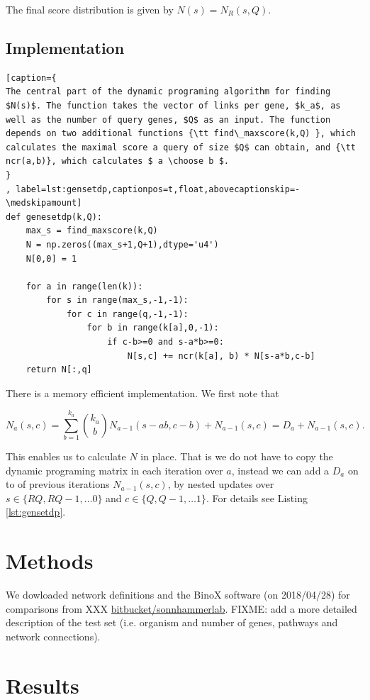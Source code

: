 \documentclass[a4paper,american]{lipics-v2016}
\begin{document}
The final score distribution is given by $N(s)=N_R(s,Q)$.

\subsection*{Implementation}

\begin{lstlisting}[caption={
The central part of the dynamic programing algorithm for finding $N(s)$. The function takes the vector of links per gene, $k_a$, as well as the number of query genes, $Q$ as an input. The function depends on two additional functions {\tt find\_maxscore(k,Q) }, which calculates the maximal score a query of size $Q$ can obtain, and {\tt ncr(a,b)}, which calculates $ a \choose b $.
}
, label=lst:gensetdp,captionpos=t,float,abovecaptionskip=-\medskipamount]
def genesetdp(k,Q):
    max_s = find_maxscore(k,Q)
    N = np.zeros((max_s+1,Q+1),dtype='u4')
    N[0,0] = 1

    for a in range(len(k)):
        for s in range(max_s,-1,-1):
            for c in range(q,-1,-1):
                for b in range(k[a],0,-1):
                    if c-b>=0 and s-a*b>=0:
                        N[s,c] += ncr(k[a], b) * N[s-a*b,c-b]
    return N[:,q]
\end{lstlisting}
There is a memory efficient implementation. We first note that

\[
N_a(s,c)=\sum_{b=1}^{k_a}{k_a \choose b} N_{a-1}(s-ab,c-b) + N_{a-1}(s,c)=D_a+N_{a-1}(s,c).
\]


This enables us to calculate $N$ in place. That is we do not have to copy the dynamic programing matrix in each iteration over $a$,
instead we can add a $D_a$ on to of previous iterations $N_{a-1}(s,c)$, by nested updates over $s \in \{ RQ, RQ-1, \ldots 0 \}$ and $c \in \{ Q, Q-1, \ldots 1 \}$. For details see Listing \ref{lst:gensetdp}.

\section*{Methods}

We dowloaded network definitions and the BinoX software (on 2018/04/28) for comparisons from XXX \url{bitbucket/sonnhammerlab}. FIXME: add a more detailed description of the test set (i.e. organism and number of genes, pathways and network connections).

\section*{Results}
\end{document}

